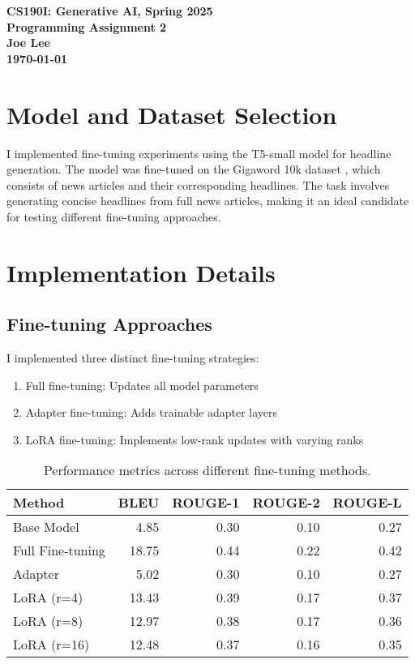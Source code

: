 \documentclass[conference]{IEEEtran}
\renewcommand{\maketitle}{%
  \begin{center}
    {\bfseries\large CS190I: Generative AI, Spring 2025\\
    Programming Assignment 2\\
    \normalsize Joe Lee\\
    \today}
  \end{center}
}
\begin{document}
\maketitle

\section{Model and Dataset Selection}
I implemented fine-tuning experiments using the T5-small model \cite{raffel2020exploring} for headline generation. The model was fine-tuned on the Gigaword 10k dataset \cite{gigaword}, which consists of news articles and their corresponding headlines. The task involves generating concise headlines from full news articles, making it an ideal candidate for testing different fine-tuning approaches.

\section{Implementation Details}

\subsection{Fine-tuning Approaches}
I implemented three distinct fine-tuning strategies:
\begin{enumerate}
    \item Full fine-tuning: Updates all model parameters
    \item Adapter fine-tuning: Adds trainable adapter layers
    \item LoRA fine-tuning: Implements low-rank updates with varying ranks
\end{enumerate}

\begin{table}[h]
\centering
\small
\setlength{\tabcolsep}{4pt}
\begin{tabular}{lrrrr}
\toprule
Method & BLEU & ROUGE-1 & ROUGE-2 & ROUGE-L \\
\midrule
Base Model & 4.85 & 0.30 & 0.10 & 0.27 \\
Full Fine-tuning & 18.75 & 0.44 & 0.22 & 0.42 \\
Adapter & 5.02 & 0.30 & 0.10 & 0.27 \\
LoRA (r=4) & 13.43 & 0.39 & 0.17 & 0.37 \\
LoRA (r=8) & 12.97 & 0.38 & 0.17 & 0.36 \\
LoRA (r=16) & 12.48 & 0.37 & 0.16 & 0.35 \\
\bottomrule
\end{tabular}
\caption{Performance metrics across different fine-tuning methods.}
\label{tab:performance}
\end{table}
\end{document}
